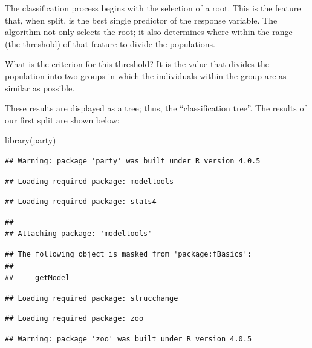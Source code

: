 \documentclass[
]{book}
\newenvironment{Shaded}{\begin{snugshade}}{\end{snugshade}}
\newcommand{\FunctionTok}[1]{\textcolor[rgb]{0.00,0.00,0.00}{#1}}
\newcommand{\NormalTok}[1]{#1}
\begin{document}
The classification process begins with the selection of a root. This is the feature that, when split, is the best single predictor of the response variable. The algorithm not only selects the root; it also determines where within the range (the threshold) of that feature to divide the populations.

What is the criterion for this threshold? It is the value that divides the population into two groups in which the individuals within the group are as similar as possible.

These results are displayed as a tree; thus, the ``classification tree''. The results of our first split are shown below:

\begin{Shaded}
\begin{Highlighting}[]
\FunctionTok{library}\NormalTok{(party)}
\end{Highlighting}
\end{Shaded}

\begin{verbatim}
## Warning: package 'party' was built under R version 4.0.5
\end{verbatim}

\begin{verbatim}
## Loading required package: modeltools
\end{verbatim}

\begin{verbatim}
## Loading required package: stats4
\end{verbatim}

\begin{verbatim}
## 
## Attaching package: 'modeltools'
\end{verbatim}

\begin{verbatim}
## The following object is masked from 'package:fBasics':
## 
##     getModel
\end{verbatim}

\begin{verbatim}
## Loading required package: strucchange
\end{verbatim}

\begin{verbatim}
## Loading required package: zoo
\end{verbatim}

\begin{verbatim}
## Warning: package 'zoo' was built under R version 4.0.5
\end{verbatim}
\end{document}
